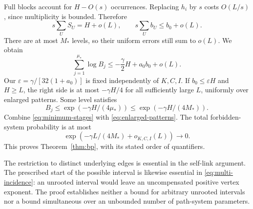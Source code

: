 Full blocks account for $H-O(s)$ occurrences. Replacing $h_i$ by $s$ costs $O(L/s)$, since multiplicity is bounded. Therefore
\[
 s\sum_U S_U=H+o(L),\qquad s\sum_U b_U\le b_0+o(L).
\]
There are at most $M_*$ levels, so their uniform errors still sum to $o(L)$. We obtain
\begin{equation}\label{eq:stage-sum}
 \sum_{j=1}^{\mu_*}\log B_j
 \le-\frac\gamma2 H+a_0b_0+o(L).
\end{equation}
Our $\varepsilon=\gamma/[32(1+a_0)]$ is fixed independently of $K,C,I$. If $b_0\le\varepsilon H$ and $H\ge L$, the right side is at most $-\gamma H/4$ for all sufficiently large $L$, uniformly over enlarged patterns. Some level satisfies
\[
 B_j\le\exp(-\gamma H/(4\mu_*))\le\exp(-\gamma H/(4M_*)).
\]
Combine \eqref{eq:minimum-stages} with \eqref{eq:enlarged-patterns}. The total forbidden-system probability is at most
\[
 \exp(-\gamma L/(4M_*)+o_{K,C,I}(L))\longrightarrow0.
\]
This proves Theorem~\ref{thm:bp}, with its stated order of quantifiers.

The restriction to distinct underlying edges is essential in the self-link argument. The prescribed start of the possible interval is likewise essential in \eqref{eq:multi-incidence}: an unrooted interval would leave an uncompensated positive vertex exponent. The proof establishes neither a bound for arbitrary unrooted intervals nor a bound simultaneous over an unbounded number of path-system parameters.
